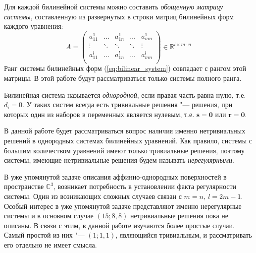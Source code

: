 \documentclass[10pt]{article}
\begin{document}
Для каждой билинейной системы можно составить \textit{обощенную матрицу системы}, составленную из развернутых в строки матриц билинейных форм каждого уравнения:
$$
	A = 
	\begin{pmatrix}
	a^{1}_{11} & \hdots  & a^{1}_{1n}  & \hdots &  a^{1}_{mn} \\ 
	\vdots & \ddots  & \ddots & \ddots  & \vdots \\
	a^{l}_{11} & \hdots  & a^{l}_{1n}  & \hdots  & a^{l}_{mn} \\ 
	\end{pmatrix} \in \mathbb{R}^{l \times m \cdot n}
$$ 
Ранг системы билинейных форм (\ref{eq:bilinear_system}) совпадает с рангом этой матрицы. В этой работе будут рассматриваться только системы полного ранга.

Билинейная система называется \textit{однородной}, если правая часть равна нулю, т.е. $d_i 
= 0$. У таких систем всегда есть тривиальные решения "--- решения, при которых один из 
наборов в переменных является нулевым, т.е. $\mathbf{s} = \mathbf{0}$ или $\mathbf{r} = 
\mathbf{0}$.

В данной работе будет рассматриваться вопрос наличия именно нетривиальных решений в 
однородных системах билинейных уравнений. Как правило, системы с большим количеством уравнений имеют только тривиальные решения, поэтому системы, имеющие нетривиальные решения будем называть \textit{нерегулярными}.

В уже упомянутой задаче описания аффинно-однородных поверхностей в пространстве $ \mathbb{C}^3 $, возникает потребность в установлении факта регулярности системы. Один из возникающих 
сложных случаев связан с 
$
	m = n,~l = 2m - 1.
$
Особый интерес в уже упомянутой задаче представляют именно нерегулярные системы и в основном случае $(15; 8, 8)$ нетривиальные решения пока не описаны. В связи с этим, в данной работе изучаются более простые случаи. Самый простой из них "--- $(1; 1, 1)$, являющийся тривиальным, и рассматривать его отдельно не имеет смысла.
\end{document}
